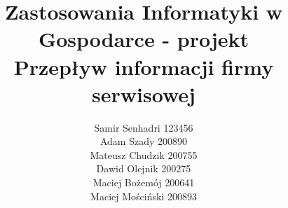 \documentclass[a4paper,11pt]{article}
\begin{document}
\makeatletter
\newcommand{\linia}{\noindent\rule{\linewidth}{0.4mm}}
\renewcommand{\maketitle}{
\begin{titlepage}
    \begin{center} \LARGE 
    \textbf{\textsc{
	    Politechnika Wrocławska \\
	    Wydział Elektroniki}}
    \end{center}
	\linia

	\vspace{3cm}
	\begin{center}
		\LARGE \textsc{\@title}
	\end{center}
	
	\vspace{1cm}
	\noindent
	\begin{minipage}[t]{0.5\textwidth}
		\begin{flushleft}
			\textit{\small Autorzy:}\\
			\normalsize \textsc{\@author} \par
		\end{flushleft}
	\end{minipage}
	\begin{minipage}[t]{0.5\textwidth}
		\begin{flushright}
			\textit{\small Praca wykonana pod przewodnictwem:}\\
			\normalsize \textsc{dr inż. Marek Woda} \par
		\end{flushright}
	\end{minipage}

    \vfill
    \begin{center}
    Wrocław, \@date
    \end{center}
\end{titlepage}%
}



\author{Samir Senhadri 123456\\ Adam Szady 200890 \\ Mateusz Chudzik 200755 \\ Dawid Olejnik 200275 \\ Maciej Bożemój 200641 \\ Maciej Mościński 200893 }
\title{Zastosowania Informatyki w Gospodarce - projekt\\ \vspace{1.5cm} Przepływ informacji firmy serwisowej\\}
\end{document}

